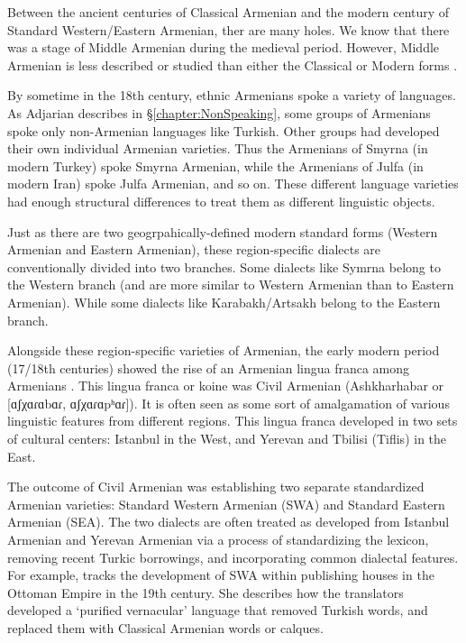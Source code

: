 Between the ancient centuries of Classical Armenian and the modern century of Standard Western/Eastern Armenian, ther are many holes. We know that there was a stage of Middle Armenian during the medieval period. However, Middle Armenian is less described or studied than either the Classical or Modern forms \citep{Karst-1901-MiddleArmenain}. 

By sometime in the 18th century, ethnic Armenians spoke a variety of languages. As Adjarian describes in \S\ref{chapter:NonSpeaking}, some groups of Armenians spoke only non-Armenian languages like Turkish. Other groups had developed their own individual Armenian varieties. Thus the Armenians of Smyrna (in modern Turkey) spoke Smyrna Armenian, while the Armenians of Julfa (in modern Iran) spoke Julfa Armenian, and so on. These different language varieties had enough structural differences to treat them as different linguistic objects. 

Just as there are two geogrpahically-defined modern standard forms (Western Armenian and Eastern Armenian), these region-specific dialects are conventionally divided into two branches. Some dialects like Symrna belong to the Western branch (and are more similar to Western Armenian than to Eastern Armenian). While some dialects like Karabakh/Artsakh belong to the Eastern branch. 

Alongside these region-specific varieties of Armenian, the early modern period (17/18th centuries) showed the rise of an Armenian lingua franca among Armenians \citep{Parnassian-1985-FormationAshkharabar,Donabedian-2018-WestArmTypoSocio}. This lingua franca or koine was Civil Armenian (Ashkharhabar or  [ɑʃχɑɾɑbɑɾ, ɑʃχɑɾɑpʰɑɾ]). It is often seen as some sort of amalgamation of various linguistic features from different regions. This lingua franca developed in two sets of cultural centers: Istanbul in the West, and Yerevan and Tbilisi (Tiflis) in the East. 

The outcome of Civil Armenian was establishing two separate standardized Armenian varieties: Standard Western Armenian (SWA) and Standard Eastern Armenian (SEA). The two dialects are often treated as developed from Istanbul Armenian and Yerevan Armenian via a process of standardizing the lexicon, removing recent Turkic borrowings, and incorporating common dialectal features. For example, \citet{Manoukian-2022-LiteraryTranslationExpansionOttomanArmenian} tracks the development of SWA within publishing houses in the Ottoman Empire in the 19th century. She describes how the translators developed a `purified vernacular' language that removed Turkish words, and replaced them with Classical Armenian words or calques. 


